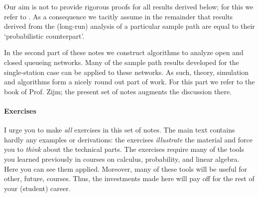 Our aim is not to provide rigorous proofs for all results derived below; for this we refer to
\cite{el-taha98:_sampl_path_analy_queuein_system}. As a consequence we tacitly
assume in the remainder that results derived from the (long-run)
analysis of a particular sample path are equal to their `probabilistic
counterpart'. 

In the second part of these notes we construct algorithms to analyze open and closed
queueing networks. Many of the sample path results developed for the
single-station case can be applied to these networks. As such, theory,
simulation and algorithms form a nicely round out part of work.  For
this part we refer to the book of Prof. Zijm; the present set of notes
augments the discussion there.


\paragraph{Exercises}

I urge you to make \emph{all} exercises in this set of notes.
The main text contains hardly any examples or derivations: the exercises \emph{illustrate} the material and force you to \textit{think} about the technical parts.
The exercises require many of the tools you learned previously in courses on calculus, probability, and linear algebra.
Here you can see them applied.
Moreover, many of these tools will be useful for other, future, courses.
Thus, the investments made here will pay off for the rest of your (student) career.

